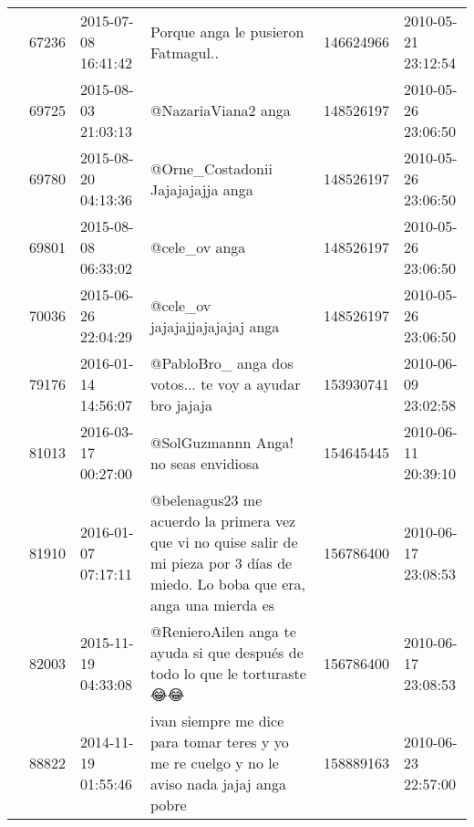 \begin{tabular}{llllrl}
           & 67236   & 2015-07-08 16:41:42 &                                                                                                           Porque anga le pusieron Fatmagul.. &   146624966 & 2010-05-21 23:12:54 \\
           & 69725   & 2015-08-03 21:03:13 &                                                                                                                         @NazariaViana2  anga &   148526197 & 2010-05-26 23:06:50 \\
           & 69780   & 2015-08-20 04:13:36 &                                                                                                            @Orne\_Costadonii Jajajajajja anga &   148526197 & 2010-05-26 23:06:50 \\
           & 69801   & 2015-08-08 06:33:02 &                                                                                                                                @cele\_ov anga &   148526197 & 2010-05-26 23:06:50 \\
           & 70036   & 2015-06-26 22:04:29 &                                                                                                              @cele\_ov  jajajajjajajajaj anga &   148526197 & 2010-05-26 23:06:50 \\
           & 79176   & 2016-01-14 14:56:07 &                                                                                      @PabloBro\_ anga dos votos... te voy a ayudar bro jajaja &   153930741 & 2010-06-09 23:02:58 \\
           & 81013   & 2016-03-17 00:27:00 &                                                                                                        @SolGuzmannn  Anga! no seas envidiosa &   154645445 & 2010-06-11 20:39:10 \\
           & 81910   & 2016-01-07 07:17:11 &            @belenagus23 me acuerdo la primera vez que vi no quise salir de mi pieza por 3 días de miedo. Lo boba que era, anga una mierda es &   156786400 & 2010-06-17 23:08:53 \\
           & 82003   & 2015-11-19 04:33:08 &                                                                   @RenieroAilen anga te ayuda si que después de todo lo que le torturaste 😂😂 &   156786400 & 2010-06-17 23:08:53 \\
           & 88822   & 2014-11-19 01:55:46 &                                                  ivan siempre me dice para tomar teres y yo me re cuelgo y no le aviso nada jajaj anga pobre &   158889163 & 2010-06-23 22:57:00 \\

\end{tabular}

